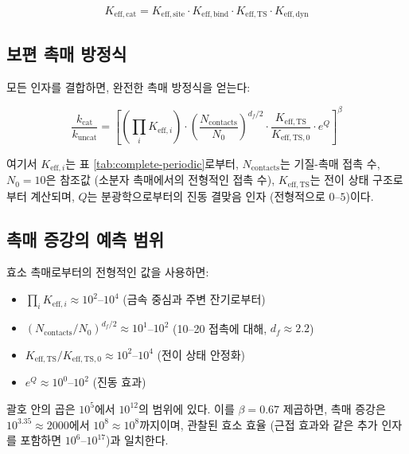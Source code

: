 \documentclass[12pt,a4paper]{article}
\newcommand{\df}{d_{\!f}}
\begin{document}
	\begin{equation}
		K_{\mathrm{eff},\text{cat}} = K_{\mathrm{eff},\text{site}} \cdot K_{\mathrm{eff},\text{bind}} \cdot K_{\mathrm{eff},\text{TS}} \cdot K_{\mathrm{eff},\text{dyn}}
		\label{eq:keff-cat}
	\end{equation}
	
	\subsection{보편 촉매 방정식}
	
	모든 인자를 결합하면, 완전한 촉매 방정식을 얻는다:
	
	\begin{equation}
		\boxed{\frac{k_{\text{cat}}}{k_{\text{uncat}}} = \left[ \left(\prod_i K_{\mathrm{eff},i}\right) \cdot \left(\frac{N_{\text{contacts}}}{N_0}\right)^{\df/2} \cdot \frac{K_{\mathrm{eff},\text{TS}}}{K_{\mathrm{eff},\text{TS},0}} \cdot e^{Q} \right]^{\beta}}
		\label{eq:cat-universal}
	\end{equation}
	
	여기서 $K_{\mathrm{eff},i}$는 표 \ref{tab:complete-periodic}로부터, $N_{\text{contacts}}$는 기질-촉매 접촉 수, $N_0 = 10$은 참조값 (소분자 촉매에서의 전형적인 접촉 수), $K_{\mathrm{eff},\text{TS}}$는 전이 상태 구조로부터 계산되며, $Q$는 분광학으로부터의 진동 결맞음 인자 (전형적으로 $0$--$5$)이다.
	
	\subsection{촉매 증강의 예측 범위}
	
	효소 촉매로부터의 전형적인 값을 사용하면:
	\begin{itemize}
		\item $\prod_i K_{\mathrm{eff},i} \approx 10^2$--$10^4$ (금속 중심과 주변 잔기로부터)
		\item $(N_{\text{contacts}}/N_0)^{\df/2} \approx 10^1$--$10^2$ (10--20 접촉에 대해, $\df \approx 2.2$)
		\item $K_{\mathrm{eff},\text{TS}}/K_{\mathrm{eff},\text{TS},0} \approx 10^2$--$10^4$ (전이 상태 안정화)
		\item $e^{Q} \approx 10^0$--$10^2$ (진동 효과)
	\end{itemize}
	
	괄호 안의 곱은 $10^5$에서 $10^{12}$의 범위에 있다. 이를 $\beta = 0.67$ 제곱하면, 촉매 증강은 $10^{3.35} \approx 2000$에서 $10^{8} \approx 10^8$까지이며, 관찰된 효소 효율 (근접 효과와 같은 추가 인자를 포함하면 $10^6$--$10^{17}$)과 일치한다.
	
\end{document}
